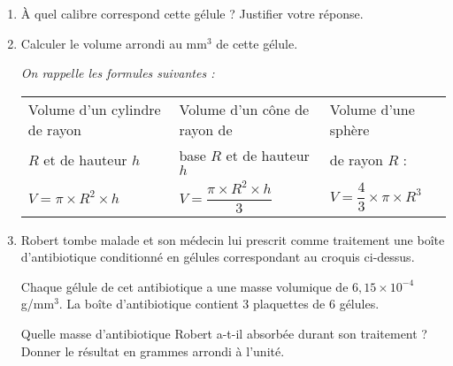 \documentclass[10pt]{article}
\begin{document}
\begin{enumerate}
\item À quel calibre correspond cette gélule ?
Justifier votre réponse.

\item Calculer le volume arrondi au mm$^3$ de cette gélule.

\emph{On rappelle les formules suivantes :}

\begin{center}
\begin{tabularx}{\linewidth}{|*{3}{>{\centering \arraybackslash \scriptsize}X|}}\hline
Volume d'un cylindre de rayon& Volume d'un cône de rayon de&  Volume d'une sphère\\
$R$ et de hauteur $h$ & base $R$ et de hauteur $h$ & de rayon $R$ :\\
\rule[-3mm]{0mm}{8mm}$V = \pi \times  R^2 \times h$& $ V = \dfrac{\pi \times  R^2 \times h}{3}$&$V = \dfrac{4}{3} \times \pi \times  R^3$\\ \hline
\end{tabularx}
\end{center}

\item Robert tombe malade et son médecin lui prescrit comme traitement une boîte
d'antibiotique conditionné en gélules correspondant au croquis ci-dessus.

Chaque gélule de cet antibiotique a une masse volumique de $6,15 \times  10^{-4}$ g/mm$^3$.
La boîte d'antibiotique contient 3 plaquettes de 6 gélules.

Quelle masse d'antibiotique Robert a-t-il absorbée durant son traitement ? Donner le
résultat en grammes arrondi à l'unité.
\end{enumerate}
\end{document}
